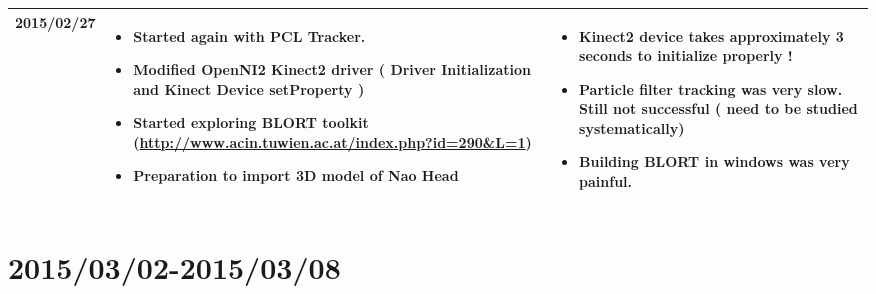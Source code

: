 \documentclass[11pt]{article} %
\begin{document}
\begin{center}
\begin{longtable}{ | c | p{6cm} | p{5cm} |}
  2015/02/27         & 
  \begin{itemize}
  \item Started again with PCL Tracker.
  \item Modified OpenNI2 Kinect2 driver ( Driver Initialization and Kinect Device setProperty )
  \item Started exploring BLORT toolkit (\url{http://www.acin.tuwien.ac.at/index.php?id=290&L=1})
  \item Preparation to import 3D model of Nao Head
\end{itemize}   
  & 
  \begin{itemize}
  										 \item Kinect2 device takes approximately 3 seconds to initialize properly !\
  										 \item Particle filter tracking was very slow. Still not successful ( need to be studied systematically)
  										 \item Building BLORT in windows was very painful.
  										 \end{itemize} \\
  										 \hline
  										   										 
    \end{longtable}
\end{center}

\newpage
\section{2015/03/02-2015/03/08}
\end{document}

